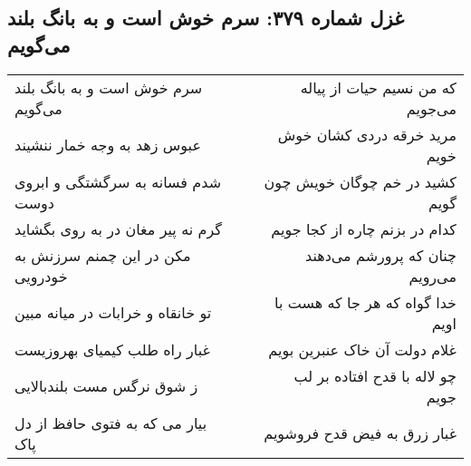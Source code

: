 \begin{center}
\section*{غزل شماره ۳۷۹: سرم خوش است و به بانگ بلند می‌گویم}
\label{sec:sh379}
\begin{longtable}{l p{0.5cm} r}
سرم خوش است و به بانگ بلند می‌گویم
&&
که من نسیم حیات از پیاله می‌جویم
\\
عبوس زهد به وجه خمار ننشیند
&&
مرید خرقه دردی کشان خوش خویم
\\
شدم فسانه به سرگشتگی و ابروی دوست
&&
کشید در خم چوگان خویش چون گویم
\\
گرم نه پیر مغان در به روی بگشاید
&&
کدام در بزنم چاره از کجا جویم
\\
مکن در این چمنم سرزنش به خودرویی
&&
چنان که پرورشم می‌دهند می‌رویم
\\
تو خانقاه و خرابات در میانه مبین
&&
خدا گواه که هر جا که هست با اویم
\\
غبار راه طلب کیمیای بهروزیست
&&
غلام دولت آن خاک عنبرین بویم
\\
ز شوق نرگس مست بلندبالایی
&&
چو لاله با قدح افتاده بر لب جویم
\\
بیار می که به فتوی حافظ از دل پاک
&&
غبار زرق به فیض قدح فروشویم
\\
\end{longtable}
\end{center}

